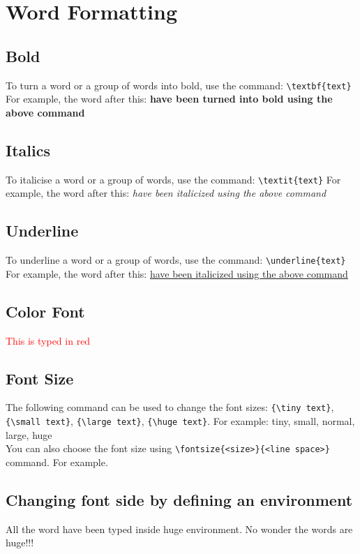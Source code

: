 \section{Word Formatting}

\subsection{Bold}
To turn a word or a group of words into bold, use the command: \verb+\textbf{text}+
For example, the word after this: \textbf{have been turned into bold using the above command}

\subsection{Italics}
To italicise a word or a group of words, use the command: \verb+\textit{text}+
For example, the word after this: \textit{have been italicized using the above command}

\subsection{Underline}
To underline a word or a group of words, use the command: \verb+\underline{text}+
For example, the word after this: \underline{have been italicized using the above command}

\subsection{Color Font}
\textcolor{red}{This is typed in red}

\subsection{Font Size}
The following command can be used to change the font sizes: \verb+{\tiny text}+,
\verb+{\small text}+, \verb+{\large text}+, \verb+{\huge text}+. For example:
{\tiny tiny}, {\small small}, normal, {\large large},  {\huge huge} \\

You can also choose the font size using \verb+\fontsize{<size>}{<line space>}+ command.
For example. {}

\subsection{Changing font side by defining an environment}
\begin{huge}
All the word have been typed inside huge environment. No wonder the words are huge!!!
\end{huge}

